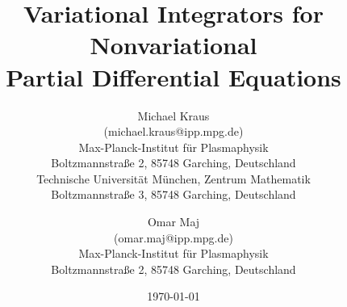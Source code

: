 \documentclass[12pt,a4paper,reqno]{article}
\begin{document}
\title{\vspace{-1em}Variational Integrators for Nonvariational\\ Partial Differential Equations}

\author{
\large{Michael Kraus}\\
\small{(michael.kraus@ipp.mpg.de)}
\vspace{.5em}\\
\normalsize{Max-Planck-Institut f\"ur Plasmaphysik}\\
\normalsize{Boltzmannstra\ss{}e 2, 85748 Garching, Deutschland}\vspace{.5em}\\
\normalsize{Technische Universit\"at M\"unchen, Zentrum Mathematik}\\
\normalsize{Boltzmannstra\ss{}e 3, 85748 Garching, Deutschland}\vspace{1em}\\
\and
\large{Omar Maj}\\
\small{(omar.maj@ipp.mpg.de)}
\vspace{.5em}\\
\normalsize{Max-Planck-Institut f\"ur Plasmaphysik}\\
\normalsize{Boltzmannstra\ss{}e 2, 85748 Garching, Deutschland}\vspace{1em}\\
}

\date{\today}

\maketitle
\end{document}
